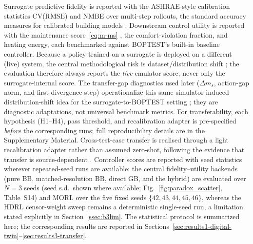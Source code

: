 \documentclass[a4paper,fleqn]{cas-sc}
\newcommand{\RMSE}{\ensuremath{\mathrm{RMSE}}}
\newcommand{\suppref}[1]{#1}
\begin{document}
Surrogate predictive fidelity is reported with the ASHRAE-style calibration
statistics CV(\RMSE) and NMBE over multi-step rollouts, the standard accuracy
measures for calibrated building models \citep{Bacher2011RCIdentification}.
Downstream control utility is reported with the maintenance score~\eqref{eq:m-ms}
\citep{Wang2025SafeDRL}, the comfort-violation fraction, and heating energy,
each benchmarked against BOPTEST's built-in baseline controller. Because a policy
trained on a surrogate is deployed on a different (live) system, the central
methodological risk is dataset/distribution shift \citep{Quinonero2009DatasetShift};
the evaluation therefore always reports the \emph{live}-emulator score, never only the
surrogate-internal score. The transfer-gap diagnostics used later ($\Delta m_s$, action-gap norm, and first divergence step) operationalize this same simulator-induced distribution-shift idea for the surrogate-to-BOPTEST setting \citep{Quinonero2009DatasetShift,RiahiSamani2026OOD}; they are diagnostic adaptations, not universal benchmark metrics. For transferability, each hypothesis (H1--H4), pass threshold, and recalibration adapter is pre-specified \emph{before} the corresponding runs; full reproducibility details are in the Supplementary Material. Cross-test-case transfer is realised through a light recalibration adapter
rather than assumed zero-shot, following the evidence that transfer is
source-dependent \citep{Hou2024MultiSource}. Controller scores are reported with
seed statistics wherever repeated-seed runs are available: the central fidelity--utility
backends (pure BB, matched-resolution BB, direct GB, and the hybrid) are evaluated over $N=3$
seeds (seed s.d.\ shown where available; Fig.~\ref{fig:paradox_scatter}, Table~\suppref{S14})
and MORL over the five fixed seeds $\{42,43,44,45,46\}$, whereas the HDRL censor-weight
sweep remains a deterministic single-seed run, a limitation stated explicitly in Section~\ref{ssec:b3lim}. The statistical protocol is summarized here; the corresponding results are reported in
Sections~\ref{sec:results1-digital-twin}--\ref{sec:results3-transfer}.
\end{document}
